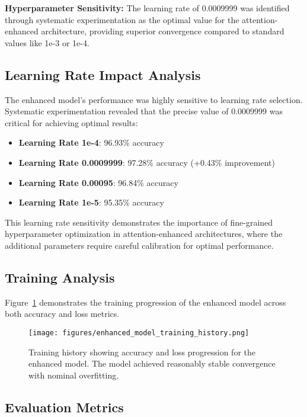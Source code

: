 \documentclass{article}
\begin{document}
\textbf{Hyperparameter Sensitivity:} The learning rate of 0.0009999 was identified through systematic experimentation as the optimal value for the attention-enhanced architecture, providing superior convergence compared to standard values like 1e-3 or 1e-4.

\subsection{Learning Rate Impact Analysis}

The enhanced model's performance was highly sensitive to learning rate selection. Systematic experimentation revealed that the precise value of 0.0009999 was critical for achieving optimal results:

\begin{itemize}
    \item \textbf{Learning Rate 1e-4}: 96.93\% accuracy
    \item \textbf{Learning Rate 0.0009999}: 97.28\% accuracy (+0.43\% improvement)
    \item \textbf{Learning Rate 0.00095}: 96.84\% accuracy  
    \item \textbf{Learning Rate 1e-5}: 95.35\% accuracy
\end{itemize}

This learning rate sensitivity demonstrates the importance of fine-grained hyperparameter optimization in attention-enhanced architectures, where the additional parameters require careful calibration for optimal performance.

\subsection{Training Analysis}

Figure~\ref{fig:training_history} demonstrates the training progression of the enhanced model across both accuracy and loss metrics.

\begin{figure}[H]
\centering
\texttt{[image: figures/enhanced\_model\_training\_history.png]}
\caption{Training history showing accuracy and loss progression for the enhanced model. The model achieved reasonably stable convergence with nominal overfitting.}
\label{fig:training_history}
\end{figure}

\subsection{Evaluation Metrics}
\end{document}
